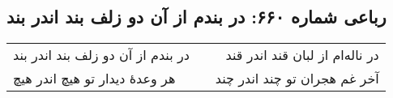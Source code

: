 \begin{center}
\section*{رباعی شماره ۶۶۰: در بندم از آن دو زلف بند اندر بند}
\label{sec:0660}
\begin{longtable}{l p{0.5cm} r}
در بندم از آن دو زلف بند اندر بند
&&
در ناله‌ام از لبان قند اندر قند
\\
هر وعدهٔ دیدار تو هیچ اندر هیچ
&&
آخر غم هجران تو چند اندر چند
\\
\end{longtable}
\end{center}
